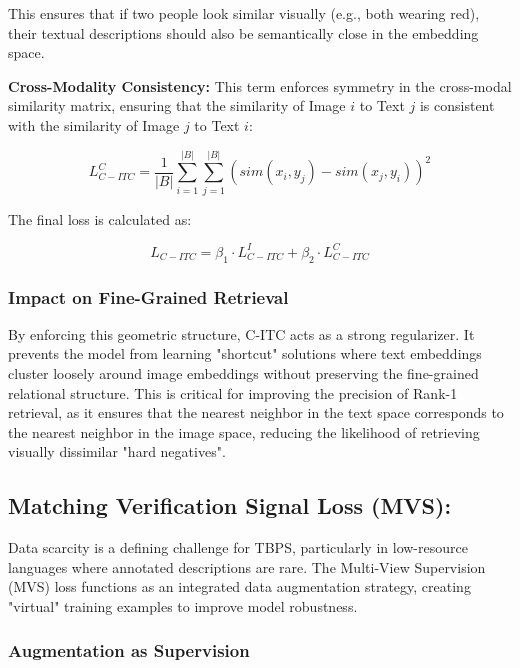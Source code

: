 \documentclass[../main.tex]{subfiles}
\begin{document}
This ensures that if two people look similar visually (e.g., both wearing red), their textual descriptions should also be semantically close in the embedding space.

\noindent \textbf{Cross-Modality Consistency:} This term enforces symmetry in the cross-modal similarity matrix, ensuring that the similarity of Image $i$ to Text $j$ is consistent with the similarity of Image $j$ to Text $i$:

\begin{equation}
    L_{C-ITC}^C = \frac{1}{|B|} \sum_{i=1}^{|B|} \sum_{j=1}^{|B|} \left( sim(x_i, y_j) - sim(x_j, y_i) \right)^2
\end{equation}

The final loss is calculated as:

\begin{equation}
    L_{C-ITC} = \beta_1 \cdot L_{C-ITC}^I + \beta_2 \cdot L_{C-ITC}^C
\end{equation}

\subsubsection{Impact on Fine-Grained Retrieval}

By enforcing this geometric structure, C-ITC acts as a strong regularizer. It prevents the model from learning "shortcut" solutions where text embeddings cluster loosely around image embeddings without preserving the fine-grained relational structure. This is critical for improving the precision of Rank-1 retrieval, as it ensures that the nearest neighbor in the text space corresponds to the nearest neighbor in the image space, reducing the likelihood of retrieving visually dissimilar "hard negatives".

\subsection{Matching Verification Signal Loss (MVS):}

Data scarcity is a defining challenge for TBPS, particularly in low-resource languages where annotated descriptions are rare. The Multi-View Supervision (MVS) loss functions as an integrated data augmentation strategy, creating "virtual" training examples to improve model robustness.

\subsubsection{Augmentation as Supervision}
\end{document}

